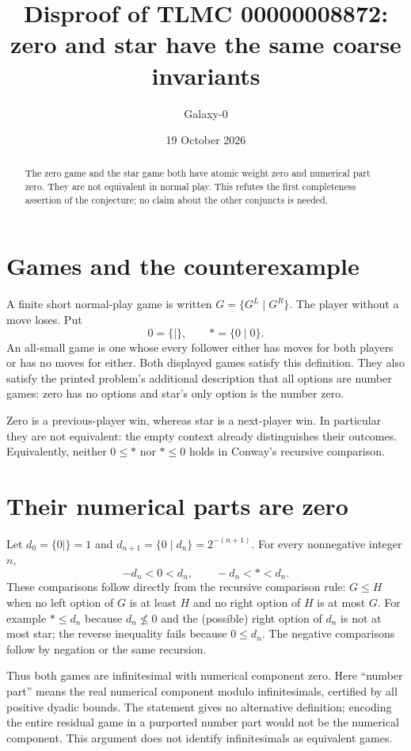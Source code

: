 \documentclass[11pt]{article}
\title{Disproof of TLMC 00000008872:\\zero and star have the same coarse invariants}
\author{Galaxy-0}
\date{19 October 2026}
\begin{document}
\maketitle
\begin{abstract}
The zero game and the star game both have atomic weight zero and numerical part zero. They are not equivalent in normal play. This refutes the first completeness assertion of the conjecture; no claim about the other conjuncts is needed.
\end{abstract}
\section{Games and the counterexample}
A finite short normal-play game is written $G=\{G^L\mid G^R\}$. The player without a move loses. Put
\[
 0=\{\mid\},\qquad *=\{0\mid0\}.
\]
An all-small game is one whose every follower either has moves for both players or has no moves for either. Both displayed games satisfy this definition. They also satisfy the printed problem's additional description that all options are number games: zero has no options and star's only option is the number zero.

Zero is a previous-player win, whereas star is a next-player win. In particular they are not equivalent: the empty context already distinguishes their outcomes. Equivalently, neither $0\le *$ nor $*\le0$ holds in Conway's recursive comparison.

\section{Their numerical parts are zero}
Let $d_0=\{0\mid\}=1$ and $d_{n+1}=\{0\mid d_n\}=2^{-(n+1)}$. For every nonnegative integer $n$,
\[
 -d_n<0<d_n,\qquad -d_n<*<d_n.
\]
These comparisons follow directly from the recursive comparison rule: $G\le H$ when no left option of $G$ is at least $H$ and no right option of $H$ is at most $G$. For example $*\le d_n$ because $d_n\not\le0$ and the (possible) right option of $d_n$ is not at most star; the reverse inequality fails because $0\le d_n$. The negative comparisons follow by negation or the same recursion.

Thus both games are infinitesimal with numerical component zero. Here ``number part'' means the real numerical component modulo infinitesimals, certified by all positive dyadic bounds. The statement gives no alternative definition; encoding the entire residual game in a purported number part would not be the numerical component. This argument does not identify infinitesimals as equivalent games.
\end{document}

